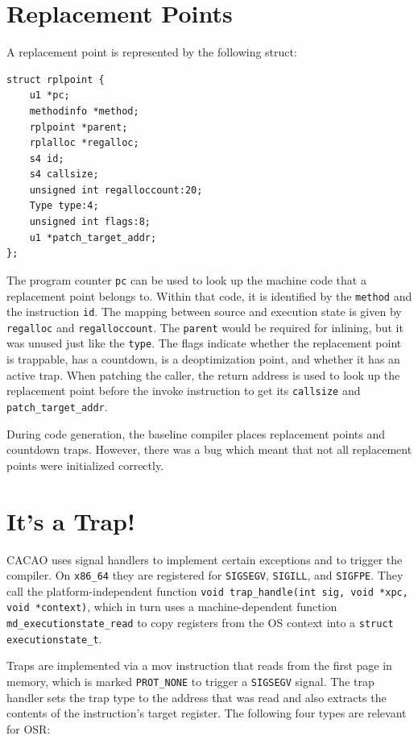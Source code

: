 \documentclass[draft,final]{vutinfth} %
\begin{document}
    \section{Replacement Points}

    A replacement point is represented by the following struct:
    \begin{lstlisting}
struct rplpoint {
    u1 *pc;
    methodinfo *method;
    rplpoint *parent;
    rplalloc *regalloc;
    s4 id;
    s4 callsize;
    unsigned int regalloccount:20;
    Type type:4;
    unsigned int flags:8;
    u1 *patch_target_addr;
};
    \end{lstlisting}
    The program counter \lstinline{pc} can be used to look up the machine code that a replacement point belongs to.
    Within that code, it is identified by the \lstinline{method} and the instruction \lstinline{id}.
    The mapping between source and execution state is given by \lstinline{regalloc} and \lstinline{regalloccount}.
    The \lstinline{parent} would be required for inlining, but it was unused just like the \lstinline{type}.
    The flags indicate whether the replacement point is trappable, has a countdown, is a deoptimization point, and whether it has an active trap.
    When patching the caller, the return address is used to look up the replacement point before the invoke instruction
    to get its \lstinline{callsize} and \lstinline{patch_target_addr}.

    During code generation, the baseline compiler places replacement points and countdown traps.
    However, there was a bug which meant that not all replacement points were initialized correctly.


    \section{It's a Trap!}

    CACAO uses signal handlers to implement certain exceptions and to trigger the compiler.
    On \texttt{x86\_64} they are registered for \lstinline{SIGSEGV}, \lstinline{SIGILL}, and \lstinline{SIGFPE}.
    They call the platform-independent function \lstinline{void trap_handle(int sig, void *xpc, void *context)},
    which in turn uses a machine-dependent function \lstinline{md_executionstate_read} to
    copy registers from the OS context into a \lstinline{struct executionstate_t}.

    Traps are implemented via a mov instruction that reads from the first page in memory,
    which is marked \lstinline{PROT_NONE} to trigger a \lstinline{SIGSEGV} signal.
    The trap handler sets the trap type to the address that was read and also extracts the contents of the instruction's target register.
    The following four types are relevant for OSR:
\end{document}
